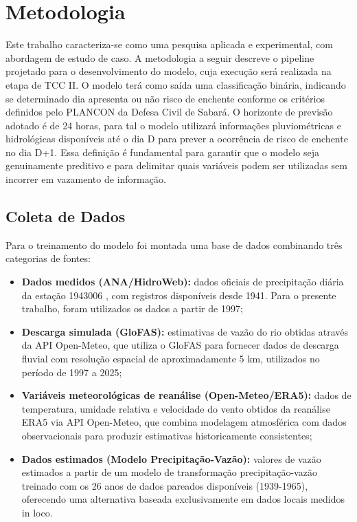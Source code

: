 \documentclass[12pt]{article}
\begin{document}
\section{Metodologia}

Este trabalho caracteriza-se como uma pesquisa aplicada e experimental, com abordagem de estudo de caso. A metodologia a seguir descreve o pipeline projetado para o desenvolvimento do modelo, cuja execução será realizada na etapa de TCC II. O modelo terá como saída uma classificação binária, indicando se determinado dia apresenta ou não risco de enchente conforme os critérios definidos pelo PLANCON da Defesa Civil de Sabará. O horizonte de previsão adotado é de 24 horas, para tal o modelo utilizará informações pluviométricas e hidrológicas disponíveis até o dia D para prever a ocorrência de risco de enchente no dia D+1. Essa definição é fundamental para garantir que o modelo seja genuinamente preditivo e para delimitar quais variáveis podem ser utilizadas sem incorrer em vazamento de informação.

\subsection{Coleta de Dados}

Para o treinamento do modelo foi montada uma base de dados combinando três categorias de fontes:

\begin{itemize}
    \item \textbf{Dados medidos (ANA/HidroWeb):} dados oficiais de precipitação diária da estação 1943006 \cite{ana2025}, com registros disponíveis desde 1941. Para o presente trabalho, foram utilizados os dados a partir de 1997;

    \item \textbf{Descarga simulada (GloFAS):} estimativas de vazão do rio obtidas através da API Open-Meteo, que utiliza o GloFAS \cite{harrigan2023} para fornecer dados de descarga fluvial com resolução espacial de aproximadamente 5 km, utilizados no período de 1997 a 2025;

    \item \textbf{Variáveis meteorológicas de reanálise (Open-Meteo/ERA5):} dados de temperatura, umidade relativa e velocidade do vento obtidos da reanálise ERA5 via API Open-Meteo, que combina modelagem atmosférica com dados observacionais para produzir estimativas historicamente consistentes;

    \item \textbf{Dados estimados (Modelo Precipitação-Vazão):} valores de vazão estimados a partir de um modelo de transformação precipitação-vazão treinado com os 26 anos de dados pareados disponíveis (1939-1965), oferecendo uma alternativa baseada exclusivamente em dados locais medidos in loco.
\end{itemize}
\end{document}
